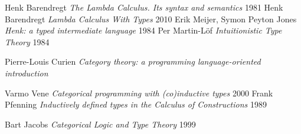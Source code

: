 \documentclass[11pt,oneside]{article}
\begin{document}
\begin{thebibliography}{9}

      Henk Barendregt \textit{The Lambda Calculus. Its syntax and semantics} 1981
      Henk Barendregt \textit{Lambda Calculus With Types} 2010
       Erik Meijer, Symon Peyton Jones \textit{Henk: a typed intermediate language} 1984
        Per Martin-Löf \textit{Intuitionistic Type Theory} 1984

    Pierre-Louis Curien \textit{Category theory: a programming language-oriented introduction}


       Varmo Vene \textit{Categorical programming with (co)inductive types} 2000
   Frank Pfenning \textit{Inductively defined types in the Calculus of Constructions} 1989

     Bart Jacobs \textit{Categorical Logic and Type Theory} 1999

\end{thebibliography}
\newpage
\end{document}
